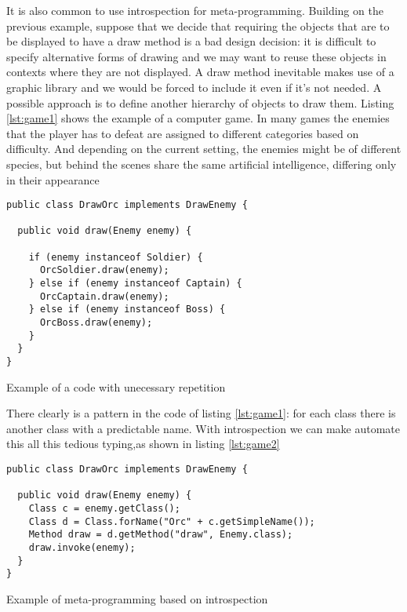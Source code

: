 It is also common to use introspection for meta-programming. Building on the previous example, suppose that we decide that
requiring the objects that are to be displayed to have a draw method is a bad design decision: it is difficult to specify
alternative forms of drawing and we may want to reuse these objects in contexts where they are not displayed. A draw method
inevitable makes use of a graphic library and we would be forced to include it even if it's not needed. A possible
approach is to define another hierarchy of objects to draw them. Listing \ref{lst:game1} shows the example of a computer game.
In many games the enemies that the player has to defeat are assigned to different categories based on difficulty. And depending
on the current setting, the enemies might be of different species, but behind the scenes share the same artificial intelligence,
differing only in their appearance

\begin{listing}[H]
\begin{verbatim}
public class DrawOrc implements DrawEnemy {

  public void draw(Enemy enemy) {
    
    if (enemy instanceof Soldier) {
      OrcSoldier.draw(enemy);
    } else if (enemy instanceof Captain) {
      OrcCaptain.draw(enemy);
    } else if (enemy instanceof Boss) {
      OrcBoss.draw(enemy);
    }
  }
} 
\end{verbatim}
\caption{Example of a code with unecessary repetition}
\label{lst:game1}
\end{listing}

There clearly is a pattern in the code of listing \ref{lst:game1}: for each class there is another class with a predictable name. With introspection we
can make automate this all this tedious typing,as shown in listing \ref{lst:game2}

\begin{listing}[H]
\begin{verbatim}
public class DrawOrc implements DrawEnemy {

  public void draw(Enemy enemy) {
    Class c = enemy.getClass();    
    Class d = Class.forName("Orc" + c.getSimpleName());    
    Method draw = d.getMethod("draw", Enemy.class);
    draw.invoke(enemy);
  }
}
\end{verbatim}
\caption{Example of meta-programming based on introspection}
\label{lst:game2}
\end{listing}

